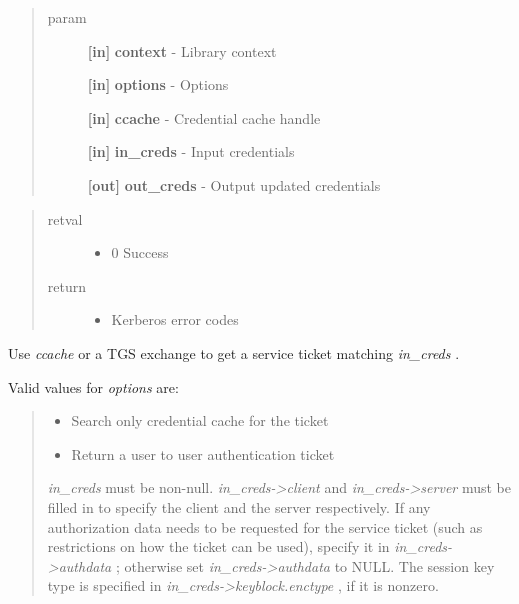 \documentclass[letterpaper,10pt,english]{sphinxmanual}
\begin{document}
\begin{quote}\begin{description}
\item[{param}] \leavevmode
\textbf{{[}in{]}} \textbf{context} - Library context

\textbf{{[}in{]}} \textbf{options} - Options

\textbf{{[}in{]}} \textbf{ccache} - Credential cache handle

\textbf{{[}in{]}} \textbf{in\_creds} - Input credentials

\textbf{{[}out{]}} \textbf{out\_creds} - Output updated credentials

\end{description}\end{quote}
\begin{quote}\begin{description}
\item[{retval}] \leavevmode\begin{itemize}
\item {} 
0   Success

\end{itemize}

\item[{return}] \leavevmode\begin{itemize}
\item {} 
Kerberos error codes

\end{itemize}

\end{description}\end{quote}

Use \emph{ccache} or a TGS exchange to get a service ticket matching \emph{in\_creds} .

Valid values for \emph{options} are:
\begin{quote}
\begin{itemize}
\item {} 
{\hyperref[appdev/refs/macros/KRB5_GC_CACHED:KRB5_GC_CACHED]{}} Search only credential cache for the ticket

\item {} 
{\hyperref[appdev/refs/macros/KRB5_GC_USER_USER:KRB5_GC_USER_USER]{}} Return a user to user authentication ticket

\end{itemize}

\emph{in\_creds} must be non-null. \emph{in\_creds-\textgreater{}client} and \emph{in\_creds-\textgreater{}server} must be filled in to specify the client and the server respectively. If any authorization data needs to be requested for the service ticket (such as restrictions on how the ticket can be used), specify it in \emph{in\_creds-\textgreater{}authdata} ; otherwise set \emph{in\_creds-\textgreater{}authdata} to NULL. The session key type is specified in \emph{in\_creds-\textgreater{}keyblock.enctype} , if it is nonzero.
\end{quote}
\end{document}
